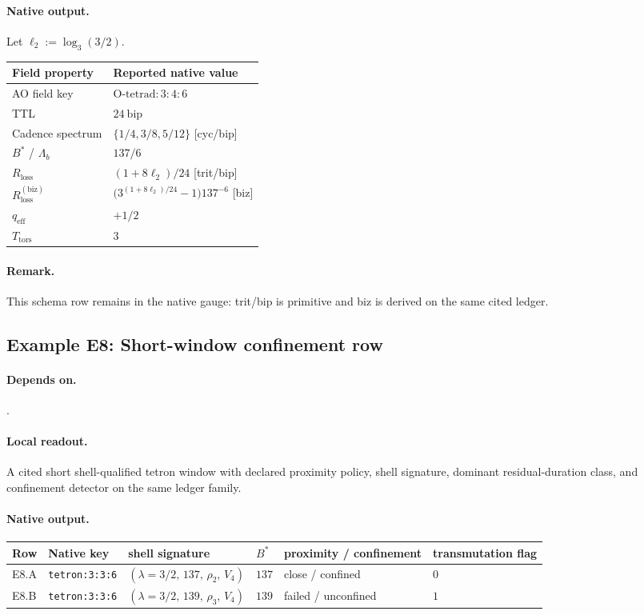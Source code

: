 \paragraph{Native output.} Let $\ell_2:=\log_3(3/2)$.
{\footnotesize
\begin{center}
\begin{tabular}{@{}ll@{}}
\toprule
Field property & Reported native value \\
\midrule
AO field key & $\mathrm{O\text{-}tetrad{:}3{:}4{:}6}$ \\
TTL & $24\ \mathrm{bip}$ \\
Cadence spectrum & $\{1/4,3/8,5/12\}$ [cyc/bip] \\
$B^*$ / $\Lambda_b$ & $137 / 6$ \\
$R_{\mathrm{loss}}$ & $(1+8\ell_2)/24$ [trit/bip] \\
$R_{\mathrm{loss}}^{(\mathrm{biz})}$ & $\bigl(3^{(1+8\ell_2)/24}-1\bigr)137^{-6}$ [biz] \\
$q_{\mathrm{eff}}$ & $+1/2$ \\
$T_{\mathrm{tors}}$ & $3$ \\
\bottomrule
\end{tabular}
\end{center}}
\paragraph{Remark.} This schema row remains in the native gauge: trit/bip is primitive and biz is derived on the same cited ledger.


\subsection{Example E8: Short-window confinement row}\label{ex:e8}
\paragraph{Depends on.} .
\paragraph{Local readout.} A cited short shell-qualified tetron window with declared proximity policy, shell signature, dominant residual-duration class, and confinement detector on the same ledger family.
\paragraph{Native output.}
{\footnotesize
\begin{center}
\begin{tabular}{@{}llllll@{}}
\toprule
Row & Native key & shell signature & $B^*$ & proximity / confinement & transmutation flag \\
\midrule
E8.A & \texttt{tetron:3:3:6} & $(\lambda\!=\!3/2,\,137,\,\rho_2,\,V_4)$ & $137$ & close / confined & $0$ \\
E8.B & \texttt{tetron:3:3:6} & $(\lambda\!=\!3/2,\,139,\,\rho_3,\,V_4)$ & $139$ & failed / unconfined & $1$ \\
\bottomrule
\end{tabular}
\end{center}}
